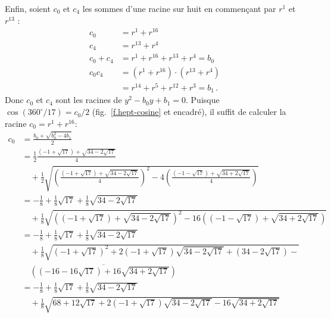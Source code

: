 Enfin, soient $c_0$ et $c_4$ les sommes d'une racine sur huit en commençant par $r^1$ et $r^{13}$ :
\begin{align*}
c_0&=r^1+r^{16}\\
c_4&=r^{13}+r^4\\
c_0+c_4&=r^1+r^{16}+r^{13}+r^4=b_0\\
c_0c_4&=(r^1+r^{16})\cdot(r^{13}+r^4)\\
&=r^{14}+r^5+r^{12}+r^3=b_1\,.
\end{align*}
Donc $c_0$ et $c_4$ sont les racines de $y^2-b_0y+b_1=0$. Puisque $\cos(360^\circ/17) = c_0/2$ (fig.~\ref{f.hept-cosine} et encadré), il suffit de calculer la racine $c_0=r^1+r^{16}$:
\begin{align*}
c_0&=\frac{b_0+\sqrt{b_0^2-4b_1}}{2}\\
&=\frac{1}{2}
     \frac{
     (-1+\sqrt{17}) + 
     \sqrt{34-2\sqrt{17}}
   }{4} \\
&\quad  +
    \frac{1}{2}
       \sqrt{\left(\frac{
     (-1+\sqrt{17}) + 
     \sqrt{34-2\sqrt{17}}
   }{4}\right)^2-4\left(\frac{
     (-1-\sqrt{17}) + 
     \sqrt{34+2\sqrt{17}}
   }{4}\right)}
   \\
&=-\frac{1}{8}+\frac{1}{8}\sqrt{17} + 
     \frac{1}{8}\sqrt{34-2\sqrt{17}}
     \\
   &\quad + 
     \frac{1}{8}\sqrt{
     \left(
     (-1+\sqrt{17}) + 
     \sqrt{34-2\sqrt{17}}
   \right)^2-16\left(
     (-1-\sqrt{17}) + 
     \sqrt{34+2\sqrt{17}}
   \right)}
\\
&=-\frac{1}{8}+\frac{1}{8}\sqrt{17} + 
     \frac{1}{8}\sqrt{34-2\sqrt{17}}
    \\
   &\quad +
     \frac{1}{8}\sqrt{
     (-1+\sqrt{17})^2 + 
     2(-1+\sqrt{17})\sqrt{34-2\sqrt{17}}+
     (34-2\sqrt{17})
   -}\\
   &\quad \overline{
     \left((-16-16\sqrt{17}) + 
     16\sqrt{34+2\sqrt{17}}\right)
   }
\\
&=-\frac{1}{8}+\frac{1}{8}\sqrt{17} + 
     \frac{1}{8}\sqrt{34-2\sqrt{17}}
     \\
   &\quad +
     \frac{1}{8}\sqrt{
     68+12\sqrt{17} + 
     2(-1+\sqrt{17})\sqrt{34-2\sqrt{17}}
   -16
     \sqrt{34+2\sqrt{17}}
   }
\end{align*}

